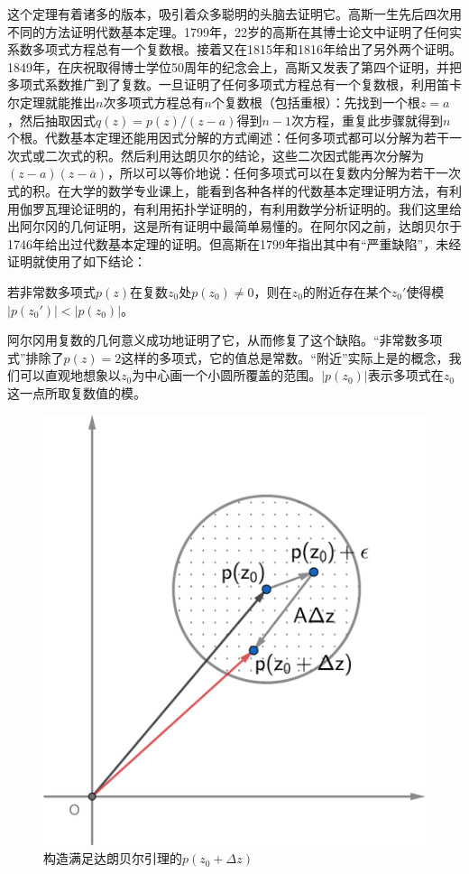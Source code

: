 \documentclass[b5paper]{ctexart}
\begin{document}
这个定理有着诸多的版本，吸引着众多聪明的头脑去证明它。高斯一生先后四次用不同的方法证明代数基本定理。1799年，22岁的高斯在其博士论文中证明了任何实系数多项式方程总有一个复数根。接着又在1815年和1816年给出了另外两个证明。1849年，在庆祝取得博士学位50周年的纪念会上，高斯又发表了第四个证明，并把多项式系数推广到了复数。一旦证明了任何多项式方程总有一个复数根，利用笛卡尔定理就能推出$n$次多项式方程总有$n$个复数根（包括重根）：先找到一个根$z = a$，然后抽取因式$q(z) = p(z)/(z - a)$得到$n-1$次方程，重复此步骤就得到$n$个根。代数基本定理还能用因式分解的方式阐述：任何多项式都可以分解为若干一次式或二次式的积。然后利用达朗贝尔的结论，这些二次因式能再次分解为$(z - a)(z - \overline{a})$，所以可以等价地说：任何多项式可以在复数内分解为若干一次式的积。在大学的数学专业课上，能看到各种各样的代数基本定理证明方法，有利用伽罗瓦理论证明的，有利用拓扑学证明的，有利用数学分析证明的。我们这里给出阿尔冈的几何证明，这是所有证明中最简单易懂的。在阿尔冈之前，达朗贝尔于1746年给出过代数基本定理的证明。但高斯在1799年指出其中有“严重缺陷”，未经证明就使用了如下结论：

\begin{lemma}[达朗贝尔引理]
若非常数多项式$p(z)$在复数$z_0$处$p(z_0) \ne 0$，则在$z_0$的附近存在某个$z_0'$使得模$|p(z_0')| < |p(z_0)|$。
\end{lemma}

阿尔冈用复数的几何意义成功地证明了它，从而修复了这个缺陷。“非常数多项式”排除了$p(z) = 2$这样的多项式，它的值总是常数。“附近”实际上是的概念，我们可以直观地想象以$z_0$为中心画一个小圆所覆盖的范围。$|p(z_0)|$表示多项式在$z_0$这一点所取复数值的模。

\begin{figure}[htbp]
  \centering
  \includegraphics[scale=0.33]{img/dalambert-lemma}
  \caption{构造满足达朗贝尔引理的$p(z_0 + \Delta z)$}
 \label{fig:dalambert-lemma}
\end{figure}
\end{document}
